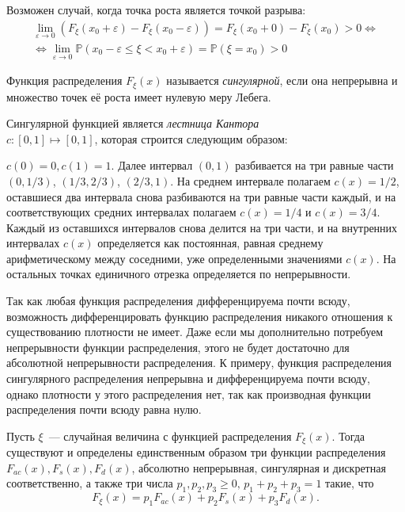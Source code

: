 \begin{rmrk}
    Возможен случай, когда точка роста является точкой разрыва:
    \begin{multline*}
    \lim _{\varepsilon \to 0} \left( F_{\xi}\left(x_{0}+\varepsilon\right) - F_{\xi}\left(x_{0}-\varepsilon\right) \right)=F_{\xi}\left(x_{0}+0\right)-F_{\xi}\left(x_{0}\right)>0 \Leftrightarrow \\
    \Leftrightarrow \lim\limits_{\varepsilon \to 0}\mathbb{P}\left(x_{0}-\varepsilon \leqslant \xi<x_{0}+\varepsilon\right)=\mathbb{P}\left(\xi=x_{0}\right)>0
    \end{multline*}
\end{rmrk}

\begin{defn}
    Функция распределения $F_\xi(x)$ называется \textit{сингулярной}, если она непрерывна и множество точек её роста имеет нулевую меру Лебега.
\end{defn}
\begin{exmp}
    Сингулярной функцией является \textit{лестница Кантора} \\ $c \colon [0, 1] \mapsto [0, 1]$, которая строится следующим образом:
    
    $c(0) = 0, c(1) = 1$. 
    Далее интервал $(0, 1)$ разбивается на три равные части $(0, 1/3)$, $(1/3, 2/3)$, $(2/3, 1)$. 
    На среднем интервале полагаем $c(x) = 1/2$, оставшиеся два интервала снова разбиваются на три равные части каждый, и на соответствующих средних интервалах полагаем $c(x) = 1/4$ и $c(x) = 3/4$. 
    Каждый из оставшихся интервалов снова делится на три части, и на внутренних интервалах $c(x)$ определяется как постоянная, равная среднему арифметическому между соседними, уже определенными значениями $c(x)$. 
    На остальных точках единичного отрезка определяется по непрерывности. 
\end{exmp}

\begin{rmrk}
    Так как любая функция распределения дифференцируема почти всюду, возможность дифференцировать функцию распределения никакого отношения к существованию плотности не имеет. 
    Даже если мы дополнительно потребуем непрерывности функции распределения, этого не будет достаточно для абсолютной непрерывности распределения. 
    К примеру, функция распределения сингулярного распределения непрерывна и дифференцируема почти всюду, однако плотности у этого распределения нет, так как производная функции распределения почти всюду равна нулю.
\end{rmrk}

\begin{namedthm}
    Пусть $\xi$~--- случайная величина с функцией распределения $F_\xi(x).$ 
    Тогда существуют и определены единственным образом три функции распределения $F_{ac}(x), F_s(x), F_d(x)$, 
    абсолютно непрерывная, сингулярная и дискретная соответственно, а также три числа $p_1, p_2, p_3 \geqslant 0,\, p_1 + p_2 + p_3 = 1$ такие, что 
    \begin{equation*}
        F_{\xi}(x)=p_{1} F_{ac}(x)+p_{2} F_{s}(x)+p_{3} F_{d}(x).
    \end{equation*}
\end{namedthm}

